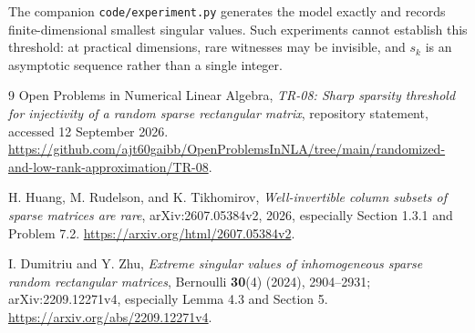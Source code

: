 \documentclass[11pt]{article}
\theoremstyle{definition}
\theoremstyle{remark}
\begin{document}
The companion \texttt{code/experiment.py} generates the model exactly and records finite-dimensional smallest singular values. Such experiments cannot establish this threshold: at practical dimensions, rare witnesses may be invisible, and $s_k$ is an asymptotic sequence rather than a single integer.

\begin{thebibliography}{9}
Open Problems in Numerical Linear Algebra,
\emph{TR-08: Sharp sparsity threshold for injectivity of a random sparse rectangular matrix}, repository statement, accessed 12 September 2026.
\url{https://github.com/ajt60gaibb/OpenProblemsInNLA/tree/main/randomized-and-low-rank-approximation/TR-08}.

H. Huang, M. Rudelson, and K. Tikhomirov,
\emph{Well-invertible column subsets of sparse matrices are rare},
arXiv:2607.05384v2, 2026, especially Section 1.3.1 and Problem 7.2.
\url{https://arxiv.org/html/2607.05384v2}.

I. Dumitriu and Y. Zhu,
\emph{Extreme singular values of inhomogeneous sparse random rectangular matrices},
Bernoulli \textbf{30}(4) (2024), 2904--2931;
arXiv:2209.12271v4, especially Lemma 4.3 and Section 5.
\url{https://arxiv.org/abs/2209.12271v4}.
\end{thebibliography}
\end{document}

